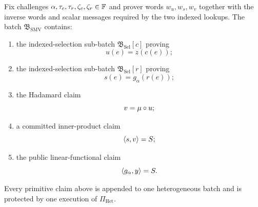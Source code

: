 \begin{definition}
\label{def:sparse-matvec-sub-batch}
Fix challenges $\alpha,\tau_c,\tau_r,\zeta_c,\zeta_r\in\mathbb{F}$ and prover words $w_u,w_s,w_v$ together with the inverse words and scalar messages required by the two indexed lookups.  The batch $\mathfrak B_{\mathrm{SMV}}$ contains:
\begin{enumerate}[label=(\roman*),leftmargin=*]
  \item the indexed-selection sub-batch $\mathfrak B_{\mathrm{Sel}}[c]$ proving
  \[
    u(e)=z(c(e));
  \]
  \item the indexed-selection sub-batch $\mathfrak B_{\mathrm{Sel}}[r]$ proving
  \[
    s(e)=g_\alpha(r(e));
  \]
  \item the Hadamard claim
  \begin{equation}
    v=\mu\circ u;
    \label{eq:sparse-contribution-hadamard}
  \end{equation}
  \item a committed inner-product claim
  \begin{equation}
    \left\langle s,v\right\rangle=S;
    \label{eq:sparse-entry-inner-product}
  \end{equation}
  \item the public linear-functional claim
  \begin{equation}
    \left\langle g_\alpha,y\right\rangle=S.
    \label{eq:sparse-output-linear-functional}
  \end{equation}
\end{enumerate}
Every primitive claim above is appended to one heterogeneous batch and is protected by one execution of $\Pi_{\mathrm{Het}}$.
\end{definition}

